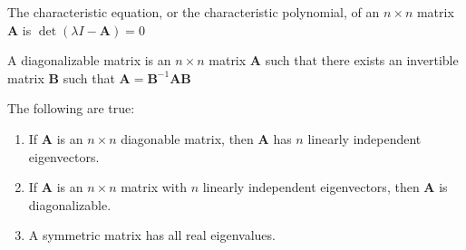 \documentclass[crop=false,class=book,oneside]{standalone}
\begin{document}
            \begin{definition}
                The characteristic equation, or
                the characteristic polynomial, of an
                ${n}\times{n}$ matrix $\mathbf{A}$
                is $\det(\lambda{I}-\mathbf{A})=0$
            \end{definition}
            \begin{definition}
                A diagonalizable matrix is an
                ${n}\times{n}$ matrix
                $\mathbf{A}$ such that there exists
                an invertible matrix $\mathbf{B}$
                such that
                $\mathbf{A}=\mathbf{B}^{-1}\mathbf{A}\mathbf{B}$
            \end{definition}
            \begin{theorem*}
                The following are true:
                \begin{enumerate}
                    \item If $\mathbf{A}$ is an ${n}\times{n}$
                        diagonable matrix, then $\mathbf{A}$
                        has $n$ linearly independent
                        eigenvectors.
                    \item If $\mathbf{A}$ is an ${n}\times{n}$
                        matrix with $n$ linearly independent
                        eigenvectors, then $\mathbf{A}$
                        is diagonalizable.
                    \item A symmetric matrix has all real
                        eigenvalues.
                \end{enumerate}
            \end{theorem*}
\end{document}
